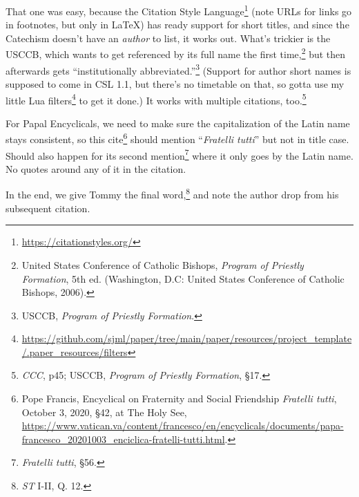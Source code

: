\documentclass[
    12pt,
    letterpaper,
    oneside,
    noraggedright
]{turabian-researchpaper}
\DeclareRobustCommand{\href}[2]{#2\footnote{\url{#1}}}
\begin{document}
That one was easy, because the
\href{https://citationstyles.org/}{Citation Style Language} (note URLs
for links go in footnotes, but only in LaTeX) has ready support for
short titles, and since the Catechism doesn't have an \emph{author} to
list, it works out. What's trickier is the USCCB, which wants to get
referenced by its full name the first time,\footnote{United States
  Conference of Catholic Bishops, \emph{Program of Priestly Formation},
  5th ed. (Washington, D.C: United States Conference of Catholic
  Bishops, 2006).} but then afterwards gets ``institutionally
abbreviated.''\footnote{USCCB, \emph{Program of Priestly Formation}.}
(Support for author short names is supposed to come in CSL 1.1, but
there's no timetable on that, so gotta use
\href{https://github.com/sjml/paper/tree/main/paper/resources/project_template/.paper_resources/filters}{my
little Lua filters} to get it done.) It works with multiple citations,
too.\footnote{\emph{CCC}, p45; USCCB, \emph{Program of Priestly
  Formation}, §17.}

For Papal Encyclicals, we need to make sure the capitalization of the
Latin name stays consistent, so this cite\footnote{Pope Francis,
  {Encyclical on Fraternity and Social Friendship \emph{Fratelli
  tutti},} October 3, 2020, §42, at The Holy See,
  \url{https://www.vatican.va/content/francesco/en/encyclicals/documents/papa-francesco_20201003_enciclica-fratelli-tutti.html}.}
should mention ``\emph{Fratelli tutti}'' but not in title case. Should
also happen for its second mention\footnote{{\emph{Fratelli tutti},}
  §56.} where it only goes by the Latin name. No quotes around any of it
in the citation.

In the end, we give Tommy the final word,\footnote{\emph{ST} I-II, Q.
  12.} and note the author drop from his subsequent citation.
\end{document}

